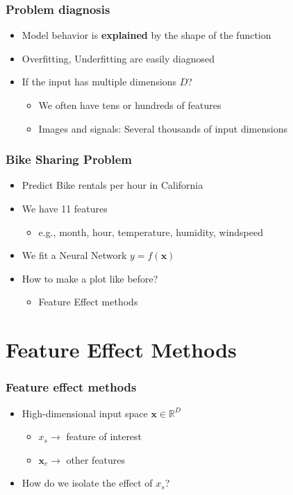 \documentclass{beamer}
\newcommand{\Vx}{\mathbf{x}}
\newcommand{\xb}{\boldsymbol{x}}
\newcommand{\obf}[1]{{\color{orange} \textbf{#1}}}
\begin{document}
\begin{frame}
  \frametitle{Problem diagnosis}

  \begin{itemize}
  \item Model behavior is \obf{explained} by the shape of the function
  \item Overfitting, Underfitting are easily diagnosed
  \item If the input has multiple dimensions $D$?
    \begin{itemize}
    \item We often have tens or hundreds of features
    \item Images and signals: Several thousands of input dimensions
    \end{itemize}
  \end{itemize}
\end{frame}



\begin{frame}
  \frametitle{Bike Sharing Problem}

  \begin{itemize}
  \item Predict Bike rentals per hour in California
  \item We have 11 features
    \begin{itemize}
    \item e.g., month, hour, temperature, humidity, windspeed
    \end{itemize}
  \item We fit a Neural Network \(y = \hat{f}(\xb)\)
  \item How to make a plot like before?
    \begin{itemize}
    \item Feature Effect methods
    \end{itemize}
  \end{itemize}
\end{frame}


\section{Feature Effect Methods}

\begin{frame}
  \frametitle{Feature effect methods}
  \begin{itemize}
  \item High-dimensional input space \(\xb \in \mathbb{R}^D\)
    \begin{itemize}
    \item \(x_s \rightarrow \) feature of interest
    \item \(\Vx_c \rightarrow\) other features
    \end{itemize}
  \item How do we isolate the effect of \(x_s\)?
  \end{itemize}
\end{frame}
\end{document}
